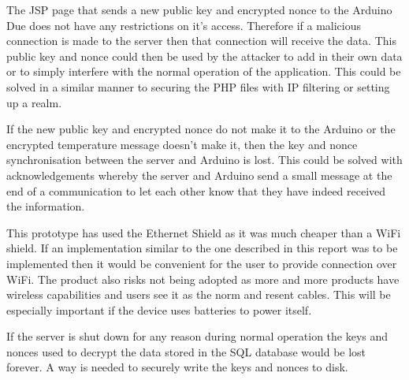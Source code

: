 The JSP page that sends a new public key and encrypted nonce to the Arduino Due does not have any restrictions on it's access. Therefore if a malicious connection is made to the server then that connection will receive the data. This public key and nonce could then be used by the attacker to add in their own data or to simply interfere with the normal operation of the application. This could be solved in a similar manner to securing the PHP files with IP filtering or setting up a realm.

If the new public key and encrypted nonce do not make it to the Arduino or the encrypted temperature message doesn't make it, then the key and nonce synchronisation between the server and Arduino is lost. This could be solved with acknowledgements whereby the server and Arduino send a small message at the end of a communication to let each other know that they have indeed received the information.

This prototype has used the Ethernet Shield as it was much cheaper than a WiFi shield. If an implementation similar to the one described in this report was to be implemented then it would be convenient for the user to provide connection over WiFi. The product also risks not being adopted as more and more products have wireless capabilities and users see it as the norm and resent cables. This will be especially important if the device uses batteries to power itself.

If the server is shut down for any reason during normal operation the keys and nonces used to decrypt the data stored in the SQL database would be lost forever. A way is needed to securely write the keys and nonces to disk.